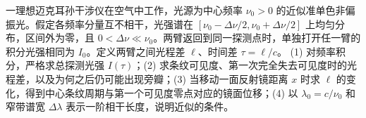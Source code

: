 一理想迈克耳孙干涉仪在空气中工作，光源为中心频率 \(\nu_0>0\) 的近似准单色非偏振光。假定各频率分量互不相干，光强谱在 \([\nu_0-\Delta\nu/2,\nu_0+\Delta\nu/2]\) 上均匀分布，区间外为零，且 \(0<\Delta\nu\ll\nu_0\)。两臂返回到同一探测点时，单独打开任一臂的积分光强相同为 \(I_0\)。定义两臂之间光程差 \(\ell\)、时间差 \(\tau=\ell/c\)。
(1) 对频率积分，严格求总探测光强 \(I(\tau)\)；(2) 求条纹可见度、第一次完全失去可见度时的光程差，以及为何之后仍可能出现旁瓣；(3) 当移动一面反射镜距离 \(x\) 时求 \(\ell\) 的变化，得到中心条纹周期与第一个可见度零点对应的镜面位移；(4) 以 \(\lambda_0=c/\nu_0\) 和窄带谱宽 \(\Delta\lambda\) 表示一阶相干长度，说明近似的条件。

